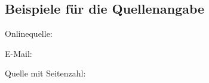 \subsection{Beispiele für die Quellenangabe}

Onlinequelle: 

E-Mail: 

Quelle mit Seitenzahl: \cite[S. 2 f.]{Vaughan2016}

